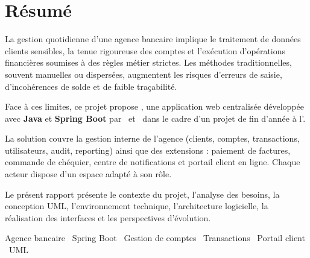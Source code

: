 \chapter*{Résumé}

La gestion quotidienne d'une agence bancaire implique le traitement de données clients sensibles, la tenue rigoureuse des comptes et l'exécution d'opérations financières soumises à des règles métier strictes. Les méthodes traditionnelles, souvent manuelles ou dispersées, augmentent les risques d'erreurs de saisie, d'incohérences de solde et de faible traçabilité.

Face à ces limites, ce projet propose \textbf{\nomapplication}, une application web centralisée développée avec \textbf{Java} et \textbf{Spring Boot} par \etudianteun\ et \etudiantedeux\ dans le cadre d'un projet de fin d'année à l'\ecole.

La solution couvre la gestion interne de l'agence (clients, comptes, transactions, utilisateurs, audit, reporting) ainsi que des extensions : paiement de factures, commande de chéquier, centre de notifications et portail client en ligne. Chaque acteur dispose d'un espace adapté à son rôle.

Le présent rapport présente le contexte du projet, l'analyse des besoins, la conception UML, l'environnement technique, l'architecture logicielle, la réalisation des interfaces et les perspectives d'évolution.

\begin{ambox}[title=Mots-clés]
Agence bancaire \textbullet\ Spring Boot \textbullet\ Gestion de comptes \textbullet\ Transactions \textbullet\ Portail client \textbullet\ UML
\end{ambox}
